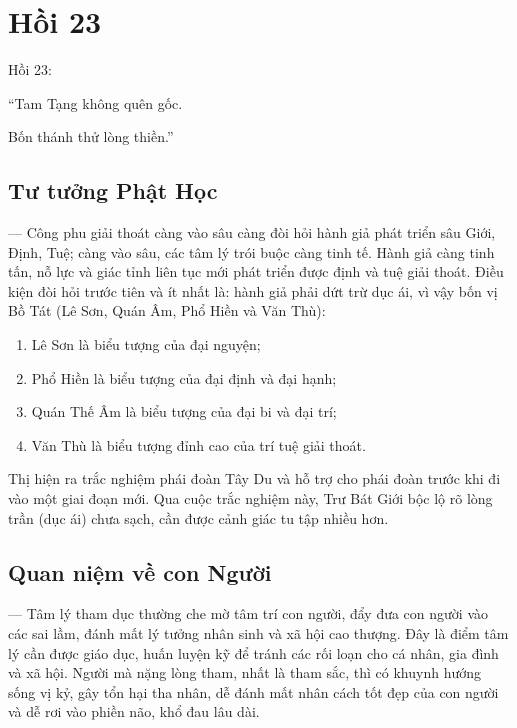 \chapter{Hồi 23} %
\label{cha:hoi_23}

Hồi 23:

\begin{itshape}
``Tam Tạng không quên gốc.

Bốn thánh thử lòng thiền.''
\end{itshape}

\section{Tư tưởng Phật Học} %
\label{sec:23_phat_hoc}

--- Công phu giải thoát càng vào sâu càng đòi hỏi hành giả phát triển sâu Giới, Định, Tuệ; càng vào sâu, các tâm lý trói buộc càng tinh tế. Hành giả càng tinh tấn, nỗ lực và giác tỉnh liên tục mới phát triển được định và tuệ giải thoát. Điều kiện đòi hỏi trước tiên và ít nhất là: hành giả phải dứt trừ dục ái, vì vậy bốn vị Bồ Tát (Lê Sơn, Quán Âm, Phổ Hiền và Văn Thù):

\begin{enumerate}[label=\itshape\arabic*\upshape/]
   \item Lê Sơn là biểu tượng của đại nguyện;

   \item Phổ Hiền là biểu tượng của đại định và đại hạnh;

   \item Quán Thế Âm là biểu tượng của đại bi và đại trí;

   \item Văn Thù là biểu tượng đỉnh cao của trí tuệ giải thoát.
\end{enumerate}

Thị hiện ra trắc nghiệm phái đoàn Tây Du và hỗ trợ cho phái đoàn trước khi đi vào một giai đoạn mới. Qua cuộc trắc nghiệm này, Trư Bát Giới bộc lộ rõ lòng trần (dục ái) chưa sạch, cần được cảnh giác tu tập nhiều hơn.

\section{Quan niệm về con Người} %
\label{sec:23_con_nguoi}

--- Tâm lý tham dục thường che mờ tâm trí con người, đẩy đưa con người vào các sai lầm, đánh mất lý tưởng nhân sinh và xã hội cao thượng. Đây là điểm tâm lý cần được giáo dục, huấn luyện kỹ để tránh các rối loạn cho cá nhân, gia đình và xã hội. Người mà nặng lòng tham, nhất là tham sắc, thì có khuynh hướng sống vị kỷ, gây tổn hại tha nhân, dễ đánh mất nhân cách tốt đẹp của con người và dễ rơi vào phiền não, khổ đau lâu dài.

